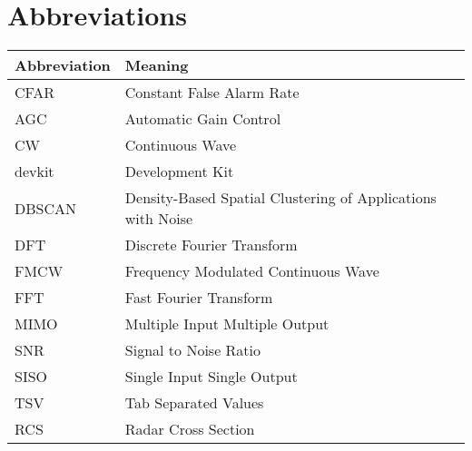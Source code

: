 
\chapter*{Abbreviations}


\begin{center}
  \begin{tabular}{| m{4cm}| m{9cm} | }
    \hline
		\textbf{Abbreviation} & \textbf{Meaning} \\
    \hline
    \hline
		CFAR & Constant False Alarm Rate \\
		AGC & Automatic Gain Control \\
		CW & Continuous Wave \\
		devkit & Development Kit \\
		DBSCAN & Density-Based Spatial Clustering of Applications with Noise \\
		DFT & Discrete Fourier Transform \\
		FMCW & Frequency Modulated Continuous Wave \\
		FFT & Fast Fourier Transform \\
		MIMO & Multiple Input Multiple Output \\
		SNR & Signal to Noise Ratio \\
		SISO & Single Input Single Output \\
		TSV & Tab Separated Values \\
		RCS & Radar Cross Section \\
    \hline
  \end{tabular}

\end{center}
